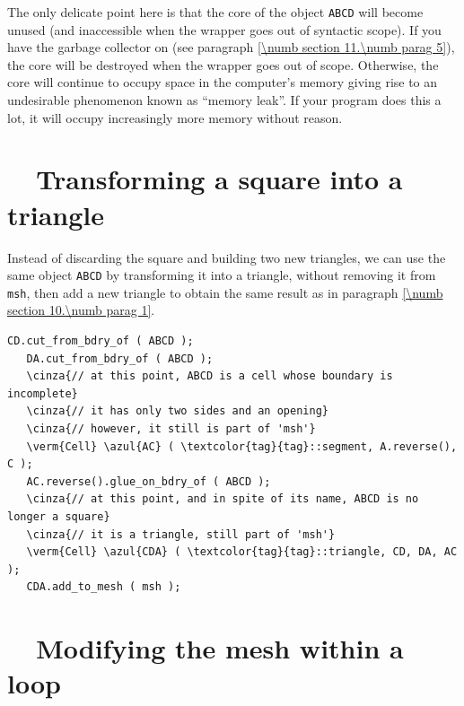 The only delicate point here is that the core of the {\small\tt{}} object
{\small\tt ABCD}
will become unused (and inaccessible when the wrapper goes out of syntactic scope).
If you have the garbage collector on (see paragraph \ref{\numb section 11.\numb parag 5}),
the core will be destroyed when the wrapper goes out of scope.
Otherwise, the core will continue to occupy space in the computer's memory giving rise
to an undesirable phenomenon known as ``memory leak''.
If your program does this a lot, it will occupy increasingly more memory without reason.


\section{~~{Transforming a square into a triangle}}\label{\numb section 10.\numb parag 2}

Instead of discarding the square and building two new triangles, we can use the same
{\small\tt{}} object {\small\tt ABCD}
by transforming it into a triangle, without removing it from {\small\tt msh}, then add
a new triangle to obtain the same result as in paragraph \ref{\numb section 10.\numb parag 1}.

\begin{Verbatim}[commandchars=\\\{\},formatcom=\small\tt,frame=single,
   label=parag-\ref{\numb section 10.\numb parag 2}.cpp,rulecolor=\color{coment},
   baselinestretch=0.94,framesep=2mm]
   CD.cut_from_bdry_of ( ABCD );
   DA.cut_from_bdry_of ( ABCD );
   \cinza{// at this point, ABCD is a cell whose boundary is incomplete}
   \cinza{// it has only two sides and an opening}
   \cinza{// however, it still is part of 'msh'}
   \verm{Cell} \azul{AC} ( \textcolor{tag}{tag}::segment, A.reverse(), C );
   AC.reverse().glue_on_bdry_of ( ABCD );
   \cinza{// at this point, and in spite of its name, ABCD is no longer a square}
   \cinza{// it is a triangle, still part of 'msh'}
   \verm{Cell} \azul{CDA} ( \textcolor{tag}{tag}::triangle, CD, DA, AC );
   CDA.add_to_mesh ( msh );
\end{Verbatim}



\section{~~Modifying the mesh within a loop}\label{\numb section 10.\numb parag 3}

